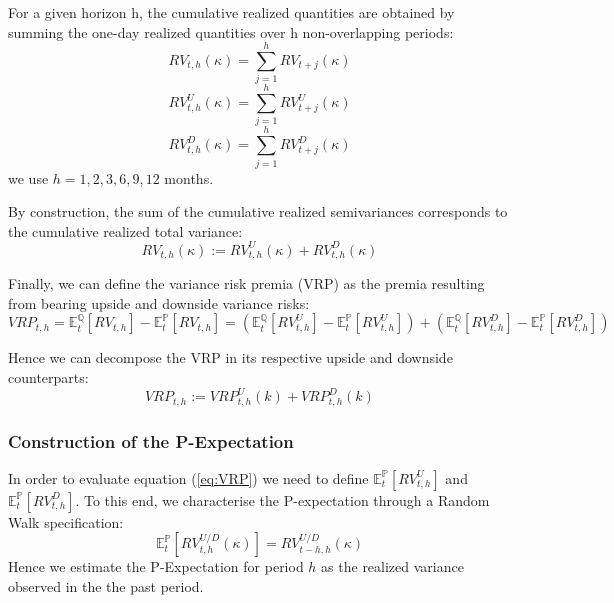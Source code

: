 For a given horizon h, the cumulative realized quantities are obtained by summing the one-day realized quantities over h non-overlapping periods:
\begin{equation}\label{eq:accumulating}
RV_{t,h}(\kappa) = \sum_{j=1}^{h} RV_{t+j}(\kappa)
\end{equation}
\begin{equation}\label{eq:accumulating1}
RV_{t,h}^{U}(\kappa) = \sum_{j=1}^{h} RV_{t+j}^{U}(\kappa)
\end{equation}
\begin{equation}\label{eq:accumulating2}
RV_{t,h}^{D}(\kappa) = \sum_{j=1}^{h} RV_{t+j}^{D}(\kappa)
\end{equation}
we use $h=1,2,3,6,9,12$ months.

By construction, the sum of the cumulative realized semivariances corresponds to the cumulative realized total variance:
\begin{equation}\label{eq:tot}
RV_{t,h}(\kappa) := RV_{t,h}^{U}(\kappa) + RV_{t,h}^{D}(\kappa)
\end{equation}

Finally, we can define the variance risk premia (VRP) as the premia resulting from bearing upside and downside variance risks: 
\begin{equation}\label{eq:VRP}
VRP_{t,h} = \mathbb{E}_{t}^{\mathbb{Q}}[RV_{t,h}] - \mathbb{E}_{t}^{\mathbb{P}}[RV_{t,h}]
=(\mathbb{E}_{t}^{\mathbb{Q}}[RV^U_{t,h}]-\mathbb{E}_{t}^{\mathbb{P}}[RV^U_{t,h}])+(\mathbb{E}_{t}^{\mathbb{Q}}[RV^D_{t,h}]-\mathbb{E}_{t}^{\mathbb{P}}[RV^D_{t,h}])
\end{equation}

Hence we can decompose the VRP in its respective upside and downside counterparts: 
\begin{equation}\label{eq:VRPUD}
VRP_{t,h} := VRP^U_{t,h}(k)+VRP^D_{t,h}(k)
\end{equation}

\subsubsection{Construction of the P-Expectation}
In order to evaluate equation (\ref{eq:VRP}) we need to define $\mathbb{E}_{t}^{\mathbb{P}}[RV^U_{t,h}]$ and $\mathbb{E}_{t}^{\mathbb{P}}[RV^D_{t,h}]$.
To this end, we characterise the P-expectation through a Random Walk specification:
\begin{equation}\label{eq:RW}
\mathbb{E}_{t}^{\mathbb{P}}[RV_{t,h}^{U/D}(\kappa)] = RV_{t-h,h}^{U/D}(\kappa)
\end{equation}
Hence we estimate the P-Expectation for period $h$ as the realized variance observed in the the past period. 

